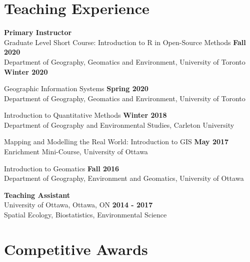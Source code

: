 \documentclass[margin,line]{res}
\begin{document}
\begin{resume}

\vspace*{.1in}
\section{\sc Teaching Experience}
\textbf{Primary Instructor}\\
Graduate Level Short Course: Introduction to R in Open-Source Methods \hfill {\textbf{Fall 2020}}\\
Department of Geography, Geomatics and Environment, University of Toronto \hfill {\textbf{Winter 2020}}

Geographic Information Systems \hfill {\textbf{Spring 2020}}\\
Department of Geography, Geomatics and Environment, University of Toronto

Introduction to Quantitative Methods
 \hfill {\textbf{Winter 2018}}\\
Department of Geography and Environmental Studies, Carleton University

Mapping and Modelling the Real World: Introduction to GIS \hfill {\textbf{May 2017}}\\
Enrichment Mini-Course, University of Ottawa

Introduction to Geomatics
\hfill {\textbf{Fall 2016}}\\
Department of Geography, Environment and Geomatics, University of Ottawa

\textbf{Teaching Assistant }\\
University of Ottawa, Ottawa, ON
\hfill {\textbf{2014 - 2017}}\\
Spatial Ecology, Biostatistics, Environmental Science

\vspace*{.1in}

\section{\sc Competitive Awards}


\end{resume}
\end{document}
